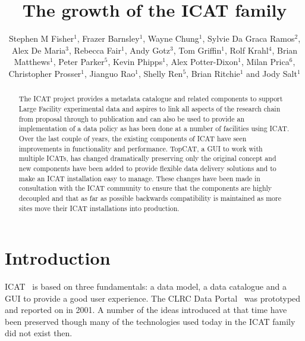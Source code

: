 \documentclass[a4paper]{jpconf}
\begin{document}
\title{The growth of the ICAT family}

\author{Stephen M Fisher\(^1\), Frazer Barnsley\(^1\), Wayne
  Chung\(^1\), Sylvie Da Graca Ramos\(^2\), Alex De Maria\(^3\), Rebecca
  Fair\(^1\), Andy Gotz\(^3\), Tom Griffin\(^1\), Rolf Krahl\(^4\), Brian
  Matthews\(^1\), Peter Parker\(^5\), Kevin Phipps\(^1\), Alex
  Potter-Dixon\(^1\), Milan Prica\(^6\), Christopher Prosser\(^1\), Jianguo
  Rao\(^1\), Shelly Ren\(^5\), Brian Ritchie\(^1\) and Jody Salt\(^1\)}
 
\address{\(^1\)Rutherford Appleton Laboratory, Didcot, OX11 0QX, UK}

\address{\(^2\)Diamond Light Source Ltd, Diamond House Harwell Campus,
  Didcot, OX11 0DE, UK}

\address{\(^3\)ESRF, 71 Avenue des Martyrs,
  38043 Grenoble, France}

\address{\(^4\)Helmholtz-Zentrum Berlin f\"{u}r Materialien und Energie GmbH, Albert-Einstein-Stra{\ss}e
  15, 12489 Berlin, Germany}

\address{\(^5\)Oak Ridge National Laboratory, 1 Bethel Valley Rd, Oak
  Ridge, TN 37831, United States}

\address{\(^6\)Elettra - Sincrotrone Trieste S.C.p.A., Strada Statale
  14, Km 163.5, 34149 Basovizza, Trieste, Italy. }
  


\begin{abstract}
The ICAT project provides a metadata catalogue and related components
to support Large Facility experimental data and aspires to link all
aspects of the research chain from proposal through to publication and
can also be used to provide an implementation of a data policy as has
been done at a number of facilities using ICAT.  Over the last couple
of years, the existing components of ICAT have seen improvements in
functionality and performance. TopCAT, a GUI to work with multiple
ICATs, has changed dramatically preserving only the original concept
and new components have been added to provide flexible data delivery
solutions and to make an ICAT installation easy to manage.  These
changes have been made in consultation with the ICAT community to
ensure that the components are highly decoupled and that as far as
possible backwards compatibility is maintained as more sites move
their ICAT installations into production.
\end{abstract}

\section{Introduction}
ICAT~\cite{ref:icatproject} is based on three fundamentals: a data
model, a data catalogue and a GUI to provide a good user
experience. The CLRC Data Portal~\cite{ref:dataportal} was prototyped
and reported on in 2001. A number of the ideas introduced at that time
have been preserved though many of the technologies used today in the
ICAT family did not exist then.
\end{document}
